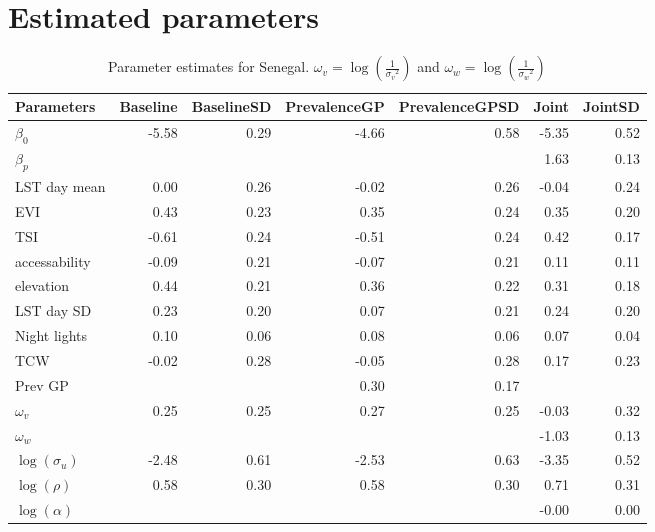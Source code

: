 \documentclass[10pt,a4]{article}
\begin{document}
\clearpage
\section{Estimated parameters}

\begin{table}[ht]
\centering
\begin{tabular}{lrrrrrr}
  \hline
Parameters & Baseline & BaselineSD & PrevalenceGP & PrevalenceGPSD & Joint & JointSD \\ 
  \hline
$\beta_0$ & -5.58 & 0.29 & -4.66 & 0.58 & -5.35 & 0.52 \\ 
  $\beta_p$ &  &  &  &  & 1.63 & 0.13 \\ 
  LST day mean & 0.00 & 0.26 & -0.02 & 0.26 & -0.04 & 0.24 \\ 
  EVI & 0.43 & 0.23 & 0.35 & 0.24 & 0.35 & 0.20 \\ 
  TSI & -0.61 & 0.24 & -0.51 & 0.24 & 0.42 & 0.17 \\ 
  accessability & -0.09 & 0.21 & -0.07 & 0.21 & 0.11 & 0.11 \\ 
  elevation & 0.44 & 0.21 & 0.36 & 0.22 & 0.31 & 0.18 \\ 
  LST day SD & 0.23 & 0.20 & 0.07 & 0.21 & 0.24 & 0.20 \\ 
  Night lights & 0.10 & 0.06 & 0.08 & 0.06 & 0.07 & 0.04 \\ 
  TCW & -0.02 & 0.28 & -0.05 & 0.28 & 0.17 & 0.23 \\ 
  Prev GP &  &  & 0.30 & 0.17 &  &  \\ 
  $\omega_v$ & 0.25 & 0.25 & 0.27 & 0.25 & -0.03 & 0.32 \\ 
  $\omega_w$ &  &  &  &  & -1.03 & 0.13 \\ 
  $\log(\sigma_u)$ & -2.48 & 0.61 & -2.53 & 0.63 & -3.35 & 0.52 \\ 
  $\log(\rho)$ & 0.58 & 0.30 & 0.58 & 0.30 & 0.71 & 0.31 \\ 
  $\log(\alpha)$ &  &  &  &  & -0.00 & 0.00 \\ 
   \hline
\end{tabular}
\label{parssen}
\caption[Parameter estimates for Senegal]{Parameter estimates for Senegal. $\omega_v = \log\left(\frac{1}{{\sigma_v}^2}\right)$ and $\omega_w = \log\left(\frac{1}{{\sigma_w}^2}\right)$} 
\end{table}
\end{document}
